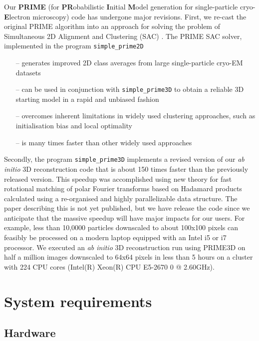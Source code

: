 \documentclass[a4paper,11pt]{article}
\newcommand{\prgname}[1]{\textcolor{NavyBlue}{\texttt{#1}}}
\begin{document}
Our \textbf{PRIME} (for \textbf{PR}obabilistic \textbf{I}nitial \textbf{M}odel generation for single-particle cryo-\textbf{E}lectron microscopy) code has undergone major revisions. First, we re-cast the original PRIME algorithm into an approach for solving  the problem of Simultaneous 2D Alignment and Clustering (SAC) \citep{reboul2016stochastic}. The PRIME SAC solver, implemented in the program \prgname{simple\_prime2D}
\begin{itemize}
    \item[--] generates improved 2D class averages from large single-particle cryo-EM datasets
    \item[--] can be used in conjunction with \prgname{simple\_prime3D} to obtain a reliable 3D starting model in a rapid and unbiased fashion
    \item[--] overcomes inherent limitations in widely used clustering approaches, such as initialisation bias and local optimality
    \item[--] is many times faster than other widely used approaches
\end{itemize}
Secondly, the program \prgname{simple\_prime3D} implements a revised version of our \textit{ab initio} 3D reconstruction code that is about 150 times faster than the previously released version. This speedup was accomplished using new theory for fast rotational matching of polar Fourier transforms based on Hadamard products calculated using a re-organised and highly parallelizable data structure. The paper describing this is not yet published, but we have release the code since we anticipate that the massive speedup will have major impacts for our users. For example, less than 10,0000 particles downscaled to about 100x100 pixels can feasibly be processed on a modern laptop equipped with an Intel i5 or i7 processor. We executed an \textit{ab initio} 3D reconstruction run using PRIME3D on half a million images downscaled to 64x64 pixels in less than 5 hours on a cluster with 224 CPU cores (Intel(R) Xeon(R) CPU E5-2670 0 @ 2.60GHz).

\section{System requirements}
\label{sysreq}

\subsection{Hardware}
\label{hardware}
\end{document}
